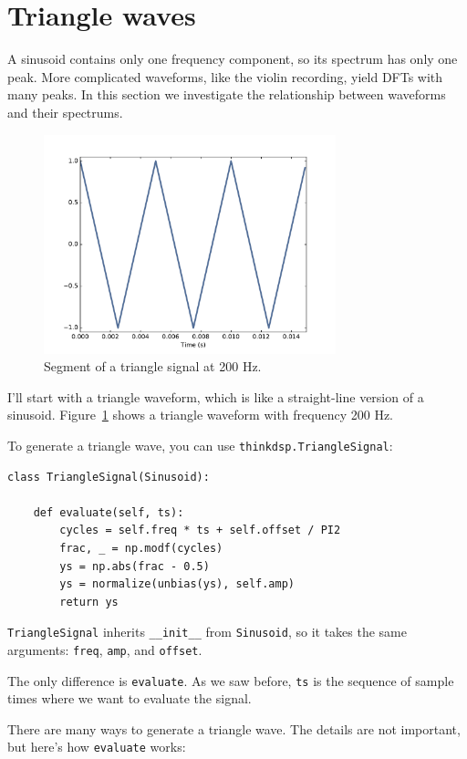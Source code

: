 \documentclass[12pt]{book}
\begin{document}
\section{Triangle waves}
\label{triangle}

A sinusoid contains only one frequency component, so its spectrum
has only one peak.  More complicated waveforms, like the
violin recording, yield DFTs with many peaks.  In this section we
investigate the relationship between waveforms and their spectrums.

\begin{figure}
\centerline{\includegraphics[height=2.5in]{figs/triangle-200-1.pdf}}
\caption{Segment of a triangle signal at 200 Hz.}
\label{fig.triangle.200.1}
\end{figure}

I'll start with a triangle waveform, which is like a straight-line
version of a sinusoid.  Figure~\ref{fig.triangle.200.1} shows a
triangle waveform with frequency 200 Hz.

To generate a triangle wave, you can use {\tt thinkdsp.TriangleSignal}:

\begin{verbatim}
class TriangleSignal(Sinusoid):
    
    def evaluate(self, ts):
        cycles = self.freq * ts + self.offset / PI2
        frac, _ = np.modf(cycles)
        ys = np.abs(frac - 0.5)
        ys = normalize(unbias(ys), self.amp)
        return ys
\end{verbatim}

{\tt TriangleSignal} inherits \verb"__init__" from {\tt Sinusoid},
so it takes the same arguments: {\tt freq}, {\tt amp}, and {\tt offset}.

The only difference is {\tt evaluate}.  As we saw before,
{\tt ts} is the sequence of sample times where we want to
evaluate the signal.

There are many ways to generate a triangle wave.  The details
are not important, but here's how {\tt evaluate} works:
\end{document}
